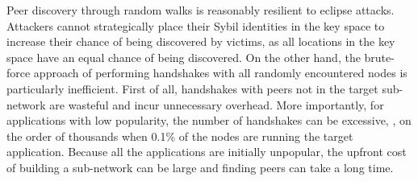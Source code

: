 
Peer discovery through random walks is reasonably resilient to eclipse attacks.
Attackers cannot strategically place their Sybil identities in the key space to increase their chance of being discovered by victims, as all locations in the key space have an equal chance of being discovered.
On the other hand, the brute-force approach of performing handshakes with all randomly encountered nodes is particularly inefficient.
First of all, handshakes with peers not in the target sub-network are wasteful and incur unnecessary overhead.
More importantly, for applications with low popularity, the number of handshakes can be excessive, \ie, on the order of thousands when 0.1\% of the nodes are running the target application.  
Because all the applications are initially unpopular, the upfront cost of building a sub-network can be large and finding peers can take a long time.
